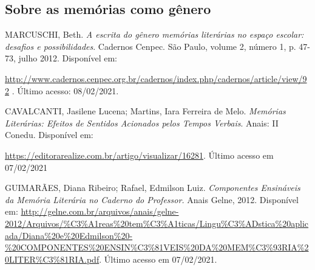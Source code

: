 \documentclass{article}
\begin{document}
\subsection{Sobre as memórias como gênero}

MARCUSCHI, Beth. \emph{A escrita do gênero memórias literárias no espaço
escolar: desafios e possibilidades}. Cadernos Cenpec. São Paulo, volume
2, número 1, p. 47-73, julho 2012. Disponível em:

\url{http://www.cadernos.cenpec.org.br/cadernos/index.php/cadernos/article/view/92}
. Último acesso: 08/02/2021.

CAVALCANTI, Jasilene Lucena; Martins, Iara Ferreira de Melo.
\emph{Memórias Literárias: Efeitos de Sentidos Acionados pelos Tempos
Verbais}. Anais: II Conedu. Disponível em:

\url{https://editorarealize.com.br/artigo/visualizar/16281}.
Último acesso em 07/02/2021

GUIMARÃES, Diana Ribeiro; Rafael, Edmilson Luiz. \emph{Componentes
Ensináveis da Memória Literária no Caderno do Professor.} Anais Gelne,
2012. Disponível em:
\url{http://gelne.com.br/arquivos/anais/gelne-2012/Arquivos/\%C3\%A1reas\%20tem\%C3\%A1ticas/Lingu\%C3\%ADstica\%20aplicada/Diana\%20e\%20Edmilson\%20-\%20COMPONENTES\%20ENSIN\%C3\%81VEIS\%20DA\%20MEM\%C3\%93RIA\%20LITER\%C3\%81RIA.pdf}. Último acesso em 07/02/2021.
\end{document}
